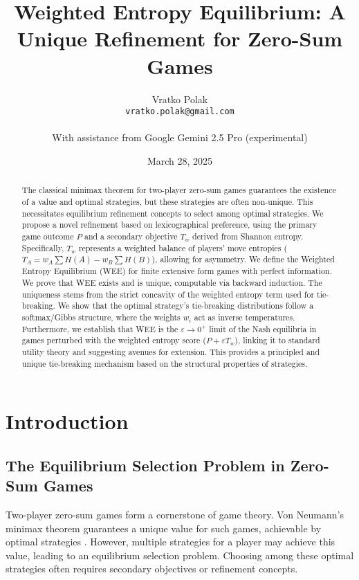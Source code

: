 \documentclass{article}
\title{Weighted Entropy Equilibrium: A Unique Refinement for Zero-Sum Games}
\author{Vratko Polak \\ {\small \texttt{vratko.polak@gmail.com}} \\ \\ {\small With assistance from Google Gemini 2.5 Pro (experimental)}} %
\date{March 28, 2025} %
\begin{document}
\maketitle

\begin{abstract}
The classical minimax theorem for two-player zero-sum games guarantees the existence of a value and optimal strategies, but these strategies are often non-unique. This necessitates equilibrium refinement concepts to select among optimal strategies. We propose a novel refinement based on lexicographical preference, using the primary game outcome $P$ and a secondary objective $T_w$ derived from Shannon entropy. Specifically, $T_w$ represents a weighted balance of players' move entropies ($T_A = w_A \sum H(A) - w_B \sum H(B)$), allowing for asymmetry. We define the Weighted Entropy Equilibrium (WEE) for finite extensive form games with perfect information. We prove that WEE exists and is unique, computable via backward induction. The uniqueness stems from the strict concavity of the weighted entropy term used for tie-breaking. We show that the optimal strategy's tie-breaking distributions follow a softmax/Gibbs structure, where the weights $w_i$ act as inverse temperatures. Furthermore, we establish that WEE is the $\varepsilon \to 0^+$ limit of the Nash equilibria in games perturbed with the weighted entropy score ($P + \varepsilon T_w$), linking it to standard utility theory and suggesting avenues for extension. This provides a principled and unique tie-breaking mechanism based on the structural properties of strategies.
\end{abstract}

\section{Introduction}

\subsection{The Equilibrium Selection Problem in Zero-Sum Games}
Two-player zero-sum games form a cornerstone of game theory. Von Neumann's minimax theorem guarantees a unique value for such games, achievable by optimal strategies \cite{placeholder_vonneumann}. However, multiple strategies for a player may achieve this value, leading to an equilibrium selection problem. Choosing among these optimal strategies often requires secondary objectives or refinement concepts.
\end{document}
